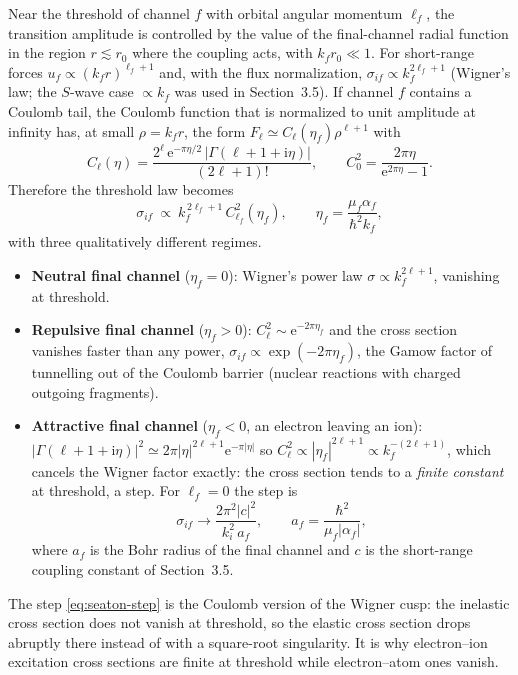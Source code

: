 \documentclass[11pt,a4paper]{book}
\numberwithin{equation}{chapter}
\newcommand{\ii}{\mathrm{i}}
\newcommand{\ee}{\mathrm{e}}
\begin{document}
Near the threshold of channel $f$ with orbital angular momentum $\ell_f$, the
transition amplitude is controlled by the value of the final-channel radial
function in the region $r\lesssim r_0$ where the coupling acts, with
$k_fr_0\ll1$. For short-range forces $u_f\propto(k_fr)^{\ell_f+1}$ and, with the
flux normalization, $\sigma_{if}\propto k_f^{2\ell_f+1}$ (Wigner's law; the
$S$-wave case $\propto k_f$ was used in Section~3.5). If channel $f$ contains a
Coulomb tail, the Coulomb function that is normalized to unit amplitude at
infinity has, at small $\rho=k_fr$, the form $F_\ell\simeq C_\ell(\eta_f)\rho^{\ell+1}$ with
\begin{equation}\label{eq:Cl}
  C_\ell(\eta)=\frac{2^\ell\,\ee^{-\pi\eta/2}\,|\Gamma(\ell+1+\ii\eta)|}{(2\ell+1)!},
  \qquad C_0^2=\frac{2\pi\eta}{\ee^{2\pi\eta}-1}.
\end{equation}
Therefore the threshold law becomes
\begin{equation}\label{eq:thr-law}
  \sigma_{if}\ \propto\ k_f^{\,2\ell_f+1}\,C_{\ell_f}^2(\eta_f),\qquad
  \eta_f=\frac{\mu_f\alpha_f}{\hbar^2k_f},
\end{equation}
with three qualitatively different regimes.
\begin{itemize}
  \item \textbf{Neutral final channel} ($\eta_f=0$): Wigner's power law
        $\sigma\propto k_f^{2\ell+1}$, vanishing at threshold.
  \item \textbf{Repulsive final channel} ($\eta_f>0$): $C_\ell^2\sim\ee^{-2\pi\eta_f}$
        and the cross section vanishes faster than any power,
        $\sigma_{if}\propto\exp(-2\pi\eta_f)$, the Gamow factor of tunnelling
        out of the Coulomb barrier (nuclear reactions with charged outgoing
        fragments).
  \item \textbf{Attractive final channel} ($\eta_f<0$, an electron leaving an
        ion): $|\Gamma(\ell+1+\ii\eta)|^2\simeq2\pi|\eta|^{2\ell+1}\ee^{-\pi|\eta|}$ so
        $C_\ell^2\propto|\eta_f|^{2\ell+1}\propto k_f^{-(2\ell+1)}$, which cancels
        the Wigner factor exactly: the cross section tends to a \emph{finite
        constant} at threshold, a step. For $\ell_f=0$ the step is
        \begin{equation}\label{eq:seaton-step}
          \sigma_{if}\to\frac{2\pi^2|c|^2}{k_i^2\,a_f},\qquad
          a_f=\frac{\hbar^2}{\mu_f|\alpha_f|},
        \end{equation}
        where $a_f$ is the Bohr radius of the final channel and $c$ is the
        short-range coupling constant of Section~3.5.
\end{itemize}
The step \eqref{eq:seaton-step} is the Coulomb version of the Wigner cusp: the
inelastic cross section does not vanish at threshold, so the elastic cross
section drops abruptly there instead of with a square-root singularity. It is
why electron--ion excitation cross sections are finite at threshold while
electron--atom ones vanish.
\end{document}
